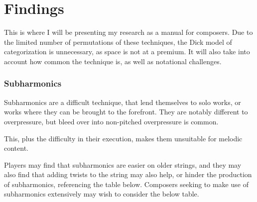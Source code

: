 
\chapter{Findings}
This is where I will be presenting my research as a manual for composers. 
Due to the limited number of permutations of these techniques, the Dick model of categorization is unnecessary, as space is not at a premium.\autocite{dickOtherFlute1989} 
It will also take into account how common the technique is, as well as notational challenges.

\subsection{Subharmonics}
Subharmonics are a difficult technique, that lend themselves to solo works, or works where they can be brought to the forefront.
They are notably different to overpressure, but bleed over into non-pitched overpressure is common.

This, plus the difficulty in their execution, makes them unsuitable for melodic content.

Players may find that subharmonics are easier on older strings, and they may also find that adding twists to the string may also help, or hinder the production of subharmonics, referencing the table below. 
Composers seeking to make use of subharmonics extensively may wish to consider the below table.

